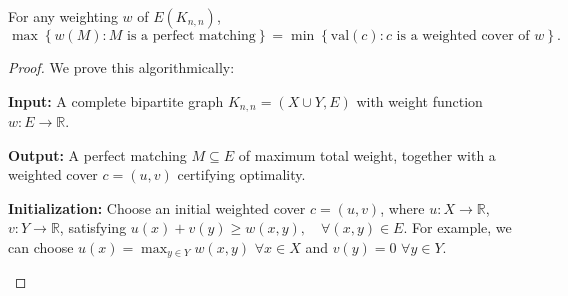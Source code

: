 \begin{theorem}
    For any weighting \(w\) of \(E(K_{n, n})\), 
    \[
        \max \left\{ w(M) : M \text{ is a perfect matching}  \right\} = \min \left\{ \mathrm{val}(c): c \text{ is a weighted cover of } w   \right\}.  
    \] 
\end{theorem}
\begin{proof}
    We prove this algorithmically:

    \begin{algorithm}[H]
\caption{Hungarian Algorithm (Maximum Weight Perfect Matching)}

\textbf{Input:} 
A complete bipartite graph \( K_{n,n} = (X \cup Y, E) \) with weight function 
\( w : E \to \mathbb{R} \).

\textbf{Output:} 
A perfect matching \( M \subseteq E \) of maximum total weight, together with a weighted cover \( c = (u,v) \) certifying optimality.

\vspace{0.5em}

\textbf{Initialization:}  
Choose an initial weighted cover \( c = (u,v) \), where 
\( u : X \to \mathbb{R} \), \( v : Y \to \mathbb{R} \), satisfying \(u(x) + v(y) \ge w(x,y), \quad \forall (x,y) \in E.\) For example, we can choose \(u(x) = \max _{y \in Y} w(x, y)\) \(\forall x \in X\) and \(v(y) = 0\) \(\forall y \in Y\).    

\vspace{0.5em}

\end{algorithm}
\end{proof}
